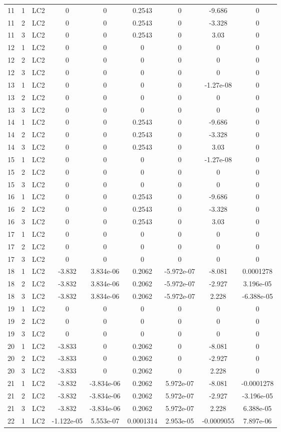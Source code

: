 \documentclass{article}%
\begin{document}
\begin{longtable}{| c c c | c c c c c c |}
11&1&LC2&0&0&0.2543&0&{-}9.686&0\\%
11&2&LC2&0&0&0.2543&0&{-}3.328&0\\%
11&3&LC2&0&0&0.2543&0&3.03&0\\%
12&1&LC2&0&0&0&0&0&0\\%
12&2&LC2&0&0&0&0&0&0\\%
12&3&LC2&0&0&0&0&0&0\\%
13&1&LC2&0&0&0&0&{-}1.27e{-}08&0\\%
13&2&LC2&0&0&0&0&0&0\\%
13&3&LC2&0&0&0&0&0&0\\%
14&1&LC2&0&0&0.2543&0&{-}9.686&0\\%
14&2&LC2&0&0&0.2543&0&{-}3.328&0\\%
14&3&LC2&0&0&0.2543&0&3.03&0\\%
15&1&LC2&0&0&0&0&{-}1.27e{-}08&0\\%
15&2&LC2&0&0&0&0&0&0\\%
15&3&LC2&0&0&0&0&0&0\\%
16&1&LC2&0&0&0.2543&0&{-}9.686&0\\%
16&2&LC2&0&0&0.2543&0&{-}3.328&0\\%
16&3&LC2&0&0&0.2543&0&3.03&0\\%
17&1&LC2&0&0&0&0&0&0\\%
17&2&LC2&0&0&0&0&0&0\\%
17&3&LC2&0&0&0&0&0&0\\%
18&1&LC2&{-}3.832&3.834e{-}06&0.2062&{-}5.972e{-}07&{-}8.081&0.0001278\\%
18&2&LC2&{-}3.832&3.834e{-}06&0.2062&{-}5.972e{-}07&{-}2.927&3.196e{-}05\\%
18&3&LC2&{-}3.832&3.834e{-}06&0.2062&{-}5.972e{-}07&2.228&{-}6.388e{-}05\\%
19&1&LC2&0&0&0&0&0&0\\%
19&2&LC2&0&0&0&0&0&0\\%
19&3&LC2&0&0&0&0&0&0\\%
20&1&LC2&{-}3.833&0&0.2062&0&{-}8.081&0\\%
20&2&LC2&{-}3.833&0&0.2062&0&{-}2.927&0\\%
20&3&LC2&{-}3.833&0&0.2062&0&2.228&0\\%
21&1&LC2&{-}3.832&{-}3.834e{-}06&0.2062&5.972e{-}07&{-}8.081&{-}0.0001278\\%
21&2&LC2&{-}3.832&{-}3.834e{-}06&0.2062&5.972e{-}07&{-}2.927&{-}3.196e{-}05\\%
21&3&LC2&{-}3.832&{-}3.834e{-}06&0.2062&5.972e{-}07&2.228&6.388e{-}05\\%
22&1&LC2&{-}1.122e{-}05&5.553e{-}07&0.0001314&2.953e{-}05&{-}0.0009055&7.897e{-}06\\%

\end{longtable}
\end{document}

